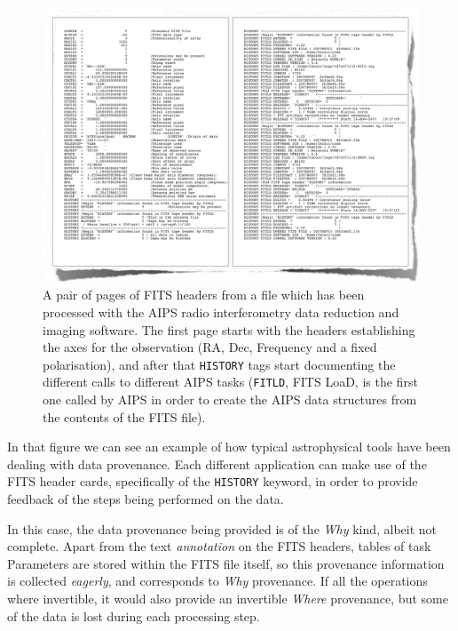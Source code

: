 		\begin{figure}[tbp]
			\centering
				\includegraphics[width=\columnwidth]
				{fig/FITSHeadersProvenance.pdf}
			\caption[FITS headers showing AIPS History]{
				A pair of pages of FITS headers from a file which
				has been processed with the AIPS radio
				interferometry data reduction and imaging software.
				The first page starts with the headers establishing
				the axes for the observation (RA, Dec, Frequency
				and a fixed polarisation), and after that
				\texttt{HISTORY} tags start documenting the
				different calls to different AIPS tasks
				(\texttt{FITLD}, FITS LoaD, is the first one
				called by AIPS in order to create the AIPS data
				structures from the contents of the FITS file).
			}
			\label{fig:fig_FITSHeadersProvenance}
		\end{figure}
		
		In that figure we can see an example of how typical
		astrophysical tools have been dealing with data provenance.
		Each different application can make use of the FITS header
		cards, specifically of the \texttt{HISTORY} keyword, in
		order to provide feedback of the steps being performed on
		the data.
		
		 In this case, the data provenance being provided is of the
		\emph{Why} kind, albeit not complete. Apart from the text
		\emph{annotation} on the FITS headers, tables of task
		Parameters are stored within the FITS file itself, so this
		provenance information is collected \emph{eagerly}, and
		corresponds to \emph{Why} provenance. If all the operations
		where invertible, it would also provide an invertible
		\emph{Where} provenance, but some of the data is lost
		during each processing step.
		

